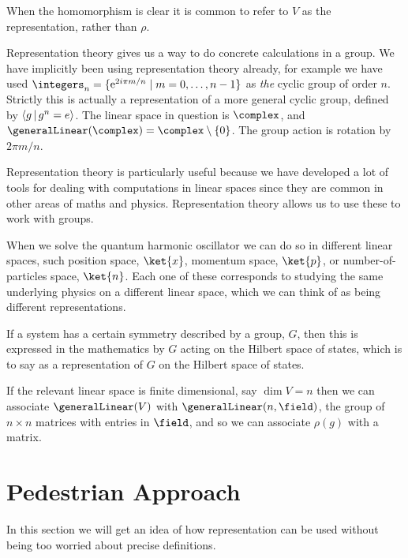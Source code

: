 When the homomorphism is clear it is common to refer to \(V\) as the
representation, rather than \(\rho\).

Representation theory gives us a way to do concrete calculations in a group.
We have implicitly been using representation theory already, for example we
have used \(\integers_n = \{\e^{2i\pi m/n} \mid m = 0, \dotsc, n - 1\}\) as
\emph{the} cyclic group of order \(n\).
Strictly this is actually a representation of a more general cyclic group,
defined by \(\presentation{g}{g^n = e}\).
The linear space in question is \(\complex\), and \(\generalLinear(\complex)
= \complex\setminus\{0\}\).
The group action is rotation by \(2\pi m/n\).

Representation theory is particularly useful because we have developed a lot
of tools for dealing with computations in linear spaces since they are common in
other areas of maths and physics.
Representation theory allows us to use these to work with groups.

\begin{app}{}{}
    When we solve the quantum harmonic oscillator we can do so in different
    linear spaces, such position space, \(\ket{x}\), momentum space, \(\ket{p}\), or
    number-of-particles space, \(\ket{n}\).
    Each one of these corresponds to studying the same underlying physics on
    a different linear space, which we can think of as being different
    representations.
    
    If a system has a certain symmetry described by a group, \(G\), then
    this is expressed in the mathematics by \(G\) acting on the Hilbert space of
    states, which is to say as a representation of \(G\) on the Hilbert space of
    states.
\end{app}

If the relevant linear space is finite dimensional, say \(\dim V = n\) then
we can associate \(\generalLinear(V)\) with \(\generalLinear(n, \field)\), the
group of \(n \times n\) matrices with entries in \(\field\), and so we can
associate \(\rho(g)\) with a matrix.

\section{Pedestrian Approach}
\begin{rmk}
    In this section we will get an idea of how representation can be used
    without being too worried about precise definitions.
\end{rmk}

